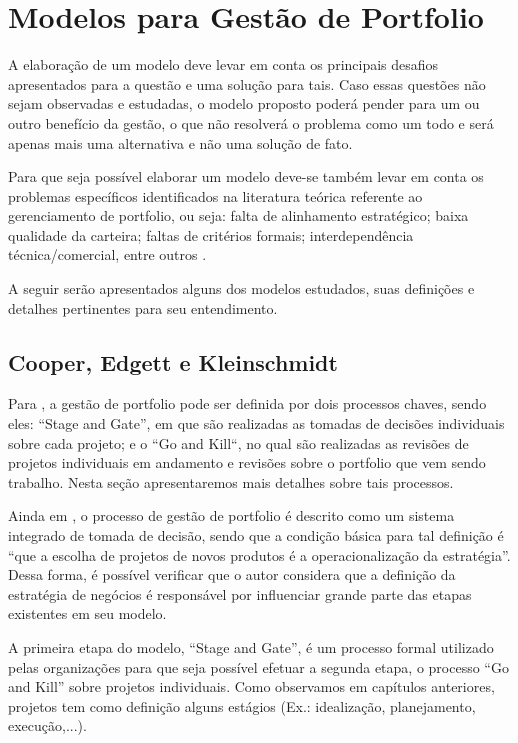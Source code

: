 \documentclass[12pt,a4paper,ruledheader,tocpage=prefix,floatnumber=continuous,pagestart=folhaderosto,font=times]{abnt}
\begin{document}
\chapter{Modelos para Gestão de Portfolio} 
A elaboração de um modelo deve levar em conta os principais desafios apresentados para a questão e uma solução para tais. Caso essas questões não sejam 
observadas e estudadas, o modelo proposto poderá pender para um ou outro benefício da gestão, o que não resolverá o problema como um todo e será apenas 
mais  uma alternativa e não uma solução de fato. 

Para que seja possível elaborar um modelo deve-se também levar em conta os problemas específicos identificados na literatura teórica referente ao
gerenciamento de portfolio, ou seja: falta de alinhamento estratégico; baixa qualidade da carteira; faltas de critérios formais; interdependência 
técnica/comercial, entre outros \cite{MARTINO1993, COOPER2001}.

A seguir serão apresentados alguns dos modelos estudados, suas definições e detalhes pertinentes para seu entendimento.

\section{Cooper, Edgett e Kleinschmidt}
Para , a gestão de portfolio pode ser definida por dois processos chaves, sendo eles: ``Stage and Gate'', em que são realizadas as tomadas de 
decisões individuais sobre cada projeto; e o ``Go and Kill``, no qual são realizadas as revisões de projetos individuais em andamento e revisões 
sobre o portfolio que vem sendo trabalho. Nesta seção apresentaremos mais detalhes sobre tais processos.

Ainda em , o processo de gestão de portfolio é descrito como um sistema integrado de tomada de decisão, sendo que a condição básica para tal definição
é ``que a escolha de projetos de novos produtos é a operacionalização da estratégia''. Dessa forma, é possível verificar que o autor considera que a definição
da estratégia de negócios é responsável por influenciar grande parte das etapas existentes em seu modelo.

A primeira etapa do modelo, ``Stage and Gate'', é um processo formal utilizado pelas organizações para que seja possível efetuar a segunda etapa, o processo
``Go and Kill'' sobre projetos individuais. Como observamos em capítulos anteriores, projetos tem como definição alguns estágios (Ex.: idealização, planejamento,
execução,...). 
\end{document}
